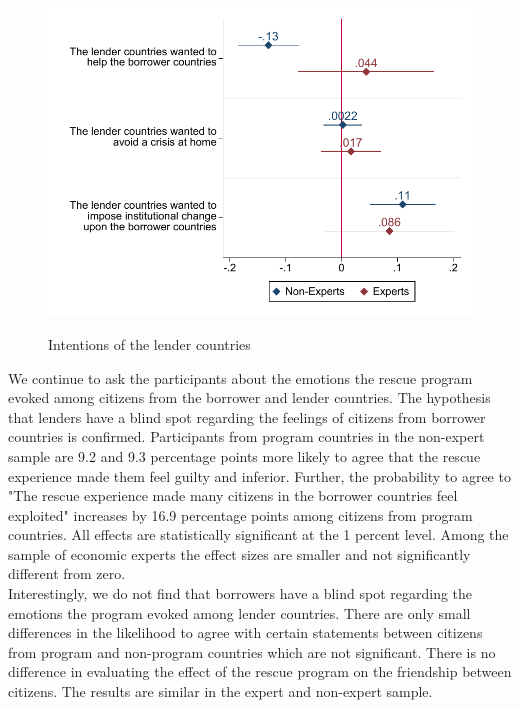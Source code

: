  \begin{figure}[H]
\begin{center}
     \caption{Intentions of the lender countries}
    
     \includegraphics[scale=0.8]{Question2_base.pdf}
     \label{fig:my_label}
      \end{center}
      \tiny
\end{figure}
 We continue to ask the participants about the emotions the rescue program evoked among citizens from the borrower and lender countries. The hypothesis that lenders have a blind spot regarding the feelings of citizens from borrower countries is confirmed. Participants from program countries in the non-expert sample are 9.2 and 9.3 percentage points more likely to agree that the rescue experience made them feel guilty and inferior. Further, the probability to agree to "The rescue experience made many citizens in the borrower countries feel exploited" increases by 16.9 percentage points among citizens from program countries. All effects are statistically significant at the 1 percent level. Among the sample of economic experts the effect sizes are smaller and not significantly different from zero. \\
 Interestingly, we do not find that borrowers have a blind spot regarding the emotions the program evoked among lender countries. There are only small differences in the likelihood to agree with certain statements between citizens from program and non-program countries which are not significant. There is no difference in evaluating the effect of the rescue program on the friendship between citizens. The results are similar in the expert and non-expert sample. \\

